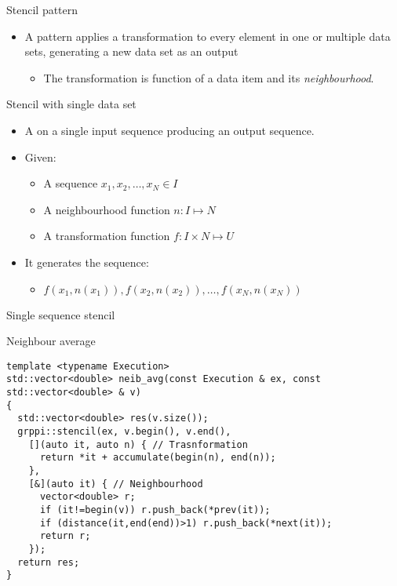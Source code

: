 \begin{frame}[t]{Stencil pattern}
\begin{itemize}
  \item A  pattern applies a transformation to every 
        element in one or multiple data sets, generating a new data set as an output
    \begin{itemize}
      \item The transformation is function of a data item and its \emph{neighbourhood}.
    \end{itemize}
\end{itemize}
\end{frame}

\begin{frame}[t]{Stencil with single data set}
\begin{itemize}
  \item A  on a single input sequence producing an output sequence.

  \vfill\pause
  \item Given:
    \begin{itemize}
      \item A sequence $x_1, x_2, \ldots, x_N \in I$
      \item A neighbourhood function $n: I \mapsto N$
      \item A transformation function $f: I \times N \mapsto U$
    \end{itemize}
  \vfill\pause
  \item It generates the sequence:
    \begin{itemize}
      \item $f(x_1, n(x_1)), f(x_2, n(x_2)), \ldots, f(x_N, n(x_N))$
    \end{itemize}
\end{itemize}
\end{frame}

\begin{frame}[t,fragile]{Single sequence stencil}
\begin{block}{Neighbour average}
\begin{lstlisting}
template <typename Execution>
std::vector<double> neib_avg(const Execution & ex, const std::vector<double> & v)
{
  std::vector<double> res(v.size());
  grppi::stencil(ex, v.begin(), v.end(), 
    [](auto it, auto n) { // Trasnformation
      return *it + accumulate(begin(n), end(n)); 
    },
    [&](auto it) { // Neighbourhood
      vector<double> r;
      if (it!=begin(v)) r.push_back(*prev(it));
      if (distance(it,end(end))>1) r.push_back(*next(it));
      return r;
    });
  return res;
}
\end{lstlisting}
\end{block}
\end{frame}

